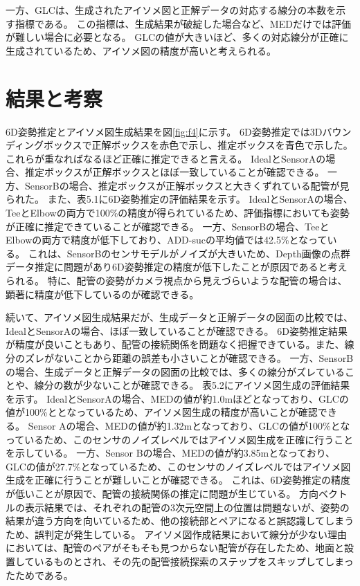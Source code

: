 一方、GLCは、生成されたアイソメ図と正解データの対応する線分の本数を示す指標である。
この指標は、生成結果が破綻した場合など、MEDだけでは評価が難しい場合に必要となる。
GLCの値が大きいほど、多くの対応線分が正確に生成されているため、アイソメ図の精度が高いと考えられる。

\section{結果と考察}
6D姿勢推定とアイソメ図生成結果を図\ref{fig:f4}に示す。
6D姿勢推定では3Dバウンディングボックスで正解ボックスを赤色で示し、推定ボックスを青色で示した。
これらが重なればなるほど正確に推定できると言える。
IdealとSensorAの場合、推定ボックスが正解ボックスとほぼ一致していることが確認できる。
一方、SensorBの場合、推定ボックスが正解ボックスと大きくずれている配管が見られた。
また、表5.1に6D姿勢推定の評価結果を示す。
IdealとSensorAの場合、TeeとElbowの両方で100\%の精度が得られているため、評価指標においても姿勢が正確に推定できていることが確認できる。
一方、SensorBの場合、TeeとElbowの両方で精度が低下しており、ADD-sucの平均値では42.5\%となっている。
これは、SensorBのセンサモデルがノイズが大きいため、Depth画像の点群データ推定に問題があり6D姿勢推定の精度が低下したことが原因であると考えられる。
特に、配管の姿勢がカメラ視点から見えづらいような配管の場合は、顕著に精度が低下しているのが確認できる。

続いて、アイソメ図生成結果だが、生成データと正解データの図面の比較では、IdealとSensorAの場合、ほぼ一致していることが確認できる。
6D姿勢推定結果が精度が良いこともあり、配管の接続関係を問題なく把握できている。また、線分のズレがないことから距離の誤差も小さいことが確認できる。
一方、SensorBの場合、生成データと正解データの図面の比較では、多くの線分がズレていることや、線分の数が少ないことが確認できる。
表5.2にアイソメ図生成の評価結果を示す。
IdealとSensorAの場合、MEDの値が約1.0mほどとなっており、GLCの値が100\%ととなっているため、アイソメ図生成の精度が高いことが確認できる。
Sensor Aの場合、MEDの値が約1.32mとなっており、GLCの値が100\%となっているため、このセンサのノイズレベルではアイソメ図生成を正確に行うことを示している。
一方、Sensor Bの場合、MEDの値が約3.85mとなっており、GLCの値が27.7\%となっているため、このセンサのノイズレベルではアイソメ図生成を正確に行うことが難しいことが確認できる。
これは、6D姿勢推定の精度が低いことが原因で、配管の接続関係の推定に問題が生じている。
方向ベクトルの表示結果では、それぞれの配管の3次元空間上の位置は問題ないが、姿勢の結果が違う方向を向いているため、他の接続部とペアになると誤認識してしまうため、誤判定が発生している。
アイソメ図作成結果において線分が少ない理由においては、配管のペアがそもそも見つからない配管が存在したため、地面と設置しているものとされ、その先の配管接続探索のステップをスキップしてしまったためである。

